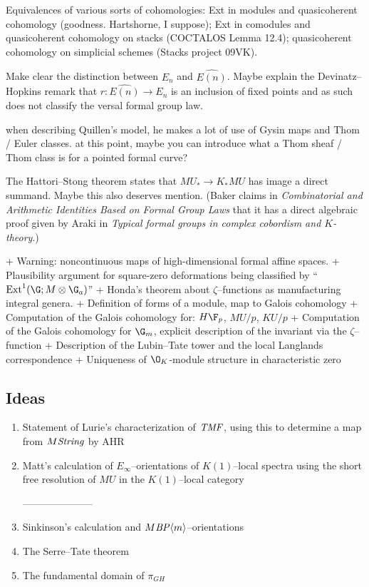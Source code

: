 \documentclass[12pt]{book}
\begin{document}
Equivalences of various sorts of cohomologies: Ext in modules and quasicoherent cohomology (goodness. Hartshorne, I suppose); Ext in comodules and quasicoherent cohomology on stacks (COCTALOS Lemma 12.4); quasicoherent cohomology on simplicial schemes (Stacks project 09VK).

Make clear the distinction between $E_n$ and $\widehat{E(n)}$. Maybe explain the Devinatz--Hopkins remark that $r: \widehat{E(n)} \to E_n$ is an inclusion of fixed points and as such does not classify the versal formal group law.


when describing Quillen's model, he makes a lot of use of Gysin maps and Thom / Euler classes. at this point, maybe you can introduce what a Thom sheaf / Thom class is for a pointed formal curve?








The Hattori--Stong theorem states that $MU_* \to K_* MU$ has image a direct summand.  Maybe this also deserves mention.  (Baker claims in \textit{Combinatorial and Arithmetic Identities Based on Formal Group Laws} that it has a direct algebraic proof given by Araki in \textit{Typical formal groups in complex cobordism and $K$-theory}.)








+ Warning: noncontinuous maps of high-dimensional formal affine spaces.
+ Plausibility argument for square-zero deformations being classified by ``$\Ext^1(\G; M \otimes \G_a)$''
+ Honda's theorem about $\zeta$--functions as manufacturing integral genera.
+ Definition of forms of a module, map to Galois cohomology
+ Computation of the Galois cohomology for: $H\F_p$, $MU/p$, $KU/p$
+ Computation of the Galois cohomology for $\G_m$, explicit description of the invariant via the $\zeta$--function
+ Description of the Lubin--Tate tower and the local Langlands correspondence
+ Uniqueness of $\O_K$-module structure in characteristic zero

\subsection*{Ideas}
\begin{enumerate}
\item Statement of Lurie's characterization of $\mathit{TMF}$, using this to determine a map from $M\mathit{String}$ by AHR
\item Matt's calculation of $E_\infty$--orientations of $K(1)$--local spectra using the short free resolution of $MU$ in the $K(1)$--local category

---------------------
\item Sinkinson's calculation and $M\mathit{BP}\langle m\rangle$--orientations
\item The Serre--Tate theorem
\item The fundamental domain of $\pi_{GH}$
\end{enumerate}
\end{document}
